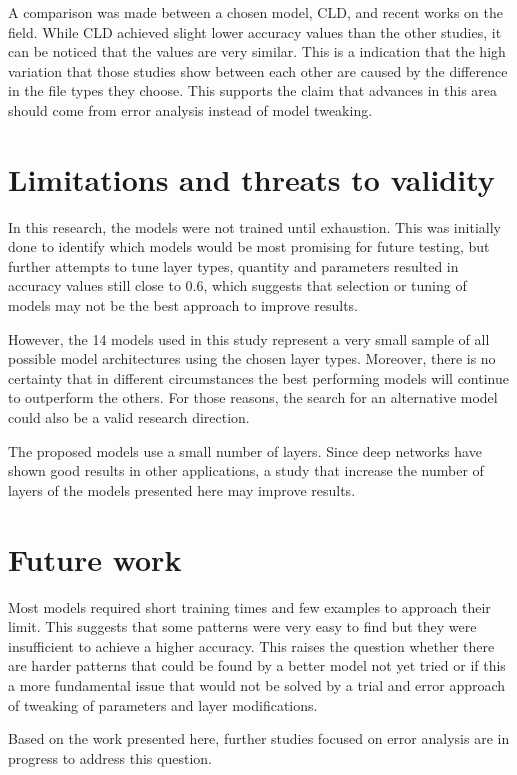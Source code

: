 A comparison was made between a chosen model, CLD, and recent works on the field. While CLD achieved slight lower accuracy values than the other studies, it can be noticed that the values are very similar. This is a indication that the high  variation that those studies show between each other are caused by the difference in the file types they choose. This supports the claim that advances in this area should come from error analysis instead of model tweaking.

\section{Limitations and threats to validity}

In this research, the models were not trained until exhaustion. This was initially done to identify which models would be most promising for future testing, but further attempts to tune layer types, quantity and parameters resulted in accuracy values still close to 0.6, which suggests that selection or tuning of models may not be the best approach to improve results.

However, the 14 models used in this study represent a very small sample of all possible model architectures using the chosen layer types. Moreover, there is no certainty that in different circumstances the best performing models will continue to outperform the others. For those reasons, the search for an alternative model could also be a valid research direction.

The proposed models use a small number of layers. Since deep networks have shown good results in other applications, a study that increase the number of layers of the models presented here may improve results.

\section{Future work}

Most models required short training times and few examples to approach their limit.
This suggests that some patterns were very easy to find but they were insufficient to achieve a higher accuracy.
This raises the question whether there are harder patterns that could be found by a better model not yet tried or if this a more fundamental issue that would not be solved by a trial and error approach of tweaking of parameters and layer modifications.

Based on the work presented here, further studies focused on error analysis are in progress to address this question.